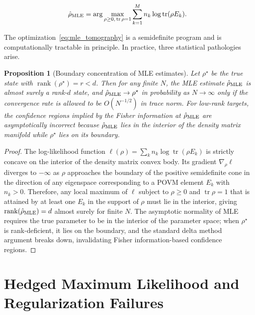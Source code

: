 \documentclass[11pt, openright, twoside]{book}
\theoremstyle{plain}
\newtheorem{proposition}[theorem]{Proposition}
\theoremstyle{definition}
\theoremstyle{remark}
\begin{document}
\begin{equation}
  \hat{\rho}_{\rm MLE} = \arg\max_{\rho \geq 0,\, \operatorname{tr}\rho = 1}
  \sum_{k=1}^M n_k \log\operatorname{tr}(\rho E_k).
  \label{eq:mle_tomography}
\end{equation}

The optimization~\eqref{eq:mle_tomography} is a semidefinite program and is computationally
tractable in principle. In practice, three statistical pathologies arise.

\begin{proposition}[Boundary concentration of MLE estimates]
\label{prop:mle_boundary}
Let $\rho^\star$ be the true state with $\operatorname{rank}(\rho^\star) = r < d$. Then for
any finite $N$, the MLE estimate $\hat\rho_{\rm MLE}$ is almost surely a rank-$d$ state,
and $\hat\rho_{\rm MLE} \to \rho^\star$ in probability as $N \to \infty$ only if the
convergence rate is allowed to be $O(N^{-1/2})$ in trace norm. For low-rank targets, the
confidence regions implied by the Fisher information at $\hat\rho_{\rm MLE}$ are
asymptotically incorrect because $\hat\rho_{\rm MLE}$ lies in the interior of the density
matrix manifold while $\rho^\star$ lies on its boundary.
\end{proposition}

\begin{proof}
The log-likelihood function $\ell(\rho) = \sum_k n_k \log\operatorname{tr}(\rho E_k)$
is strictly concave on the interior of the density matrix convex body. Its gradient
$\nabla_\rho \ell$ diverges to $-\infty$ as $\rho$ approaches the boundary of the
positive semidefinite cone in the direction of any eigenspace corresponding to a POVM
element $E_k$ with $n_k > 0$. Therefore, any local maximum of $\ell$ subject to $\rho \geq 0$
and $\operatorname{tr}\rho = 1$ that is attained by at least one $E_k$ in the support of
$\rho$ must lie in the interior, giving $\operatorname{rank}(\hat\rho_{\rm MLE}) = d$ almost
surely for finite $N$. The asymptotic normality of MLE requires the true parameter to be in
the interior of the parameter space; when $\rho^\star$ is rank-deficient, it lies on the
boundary, and the standard delta method argument breaks down, invalidating Fisher
information-based confidence regions.
\end{proof}

\section{Hedged Maximum Likelihood and Regularization Failures}
\end{document}
